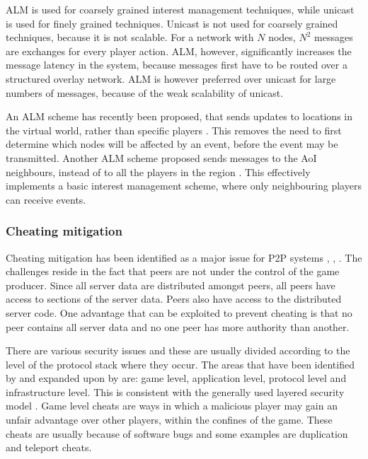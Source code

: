 \documentclass[10pt,a4paper,journal,cspaper,compsoc]{IEEEtran}
\begin{document}
ALM is used for coarsely grained interest management techniques, while unicast is used for finely grained techniques. Unicast is not used for
coarsely grained techniques, because it is not scalable. For a network with $N$ nodes, $N^2$ messages are exchanges for every player action. ALM,
however, significantly increases the message latency in the system, because messages first have to be routed over a structured overlay network. ALM
is however preferred over unicast for large numbers of messages, because of the weak scalability of unicast.

An ALM scheme has recently been proposed, that sends updates to locations in the virtual world, rather than specific players
\cite{Ghaffari_Delaunay_churn_mobility}. This removes the need to first determine which nodes will be affected by an event, before the event may be
transmitted. Another ALM scheme proposed sends messages to the AoI neighbours, instead of to all the players in the region
\cite{Seeger_area_based_gossip_multicast}. This effectively implements a basic interest management scheme, where only neighbouring players can
receive events.

\subsubsection{Cheating mitigation}
\label{key_challenges_cheating}

Cheating mitigation has been identified as a major issue for P2P systems \cite{knutsson_p2p_first}, \cite{challenges_p2p_gaming},
\cite{cheat_proof_event_ordering}. The challenges reside in the fact that peers are not under the control of the game producer. Since all server data
are distributed amongst peers, all peers have access to sections of the server data. Peers also have access to the distributed server code. One
advantage that can be exploited to prevent cheating is that no peer contains all server data and no one peer has more authority than another.

There are various security issues and these are usually divided according to the level of the protocol stack where they occur. The areas that have
been identified by \cite{cheat_proof_event_ordering} and expanded upon by \cite{cheating_taxonomy} are: game level, application level, protocol level
and infrastructure level. This is consistent with the generally used layered security model \cite{distributed_systems_security}. Game level cheats
are ways in which a malicious player may gain an unfair advantage over other players, within the confines of the game. These cheats are usually
because of software bugs and some examples are duplication and teleport cheats.
\end{document}
